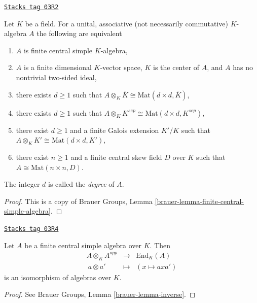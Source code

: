 \begin{theorem}
\label{etale-cohomology-theorem-central-simple-algebra}
\href{https://stacks.math.columbia.edu/tag/03R2}{\texttt{Stacks tag 03R2}}

Let $K$ be a field. For a unital, associative (not necessarily commutative)
$K$-algebra $A$ the following are equivalent
\begin{enumerate}
\item $A$ is finite central simple $K$-algebra,
\item $A$ is a finite dimensional $K$-vector space, $K$ is the center of $A$,
and $A$ has no nontrivial two-sided ideal,
\item there exists $d \geq 1$ such that
$A \otimes_K \bar K \cong \text{Mat}(d \times d, \bar K)$,
\item there exists $d \geq 1$ such that
$A \otimes_K K^{sep} \cong \text{Mat}(d \times d, K^{sep})$,
\item there exist $d \geq 1$ and a finite Galois extension $K'/K$
such that
$A \otimes_K K' \cong \text{Mat}(d \times d, K')$,
\item there exist $n \geq 1$ and a finite central skew field $D$
over $K$ such that $A \cong \text{Mat}(n \times n, D)$.
\end{enumerate}
The integer $d$ is called the {\it degree} of $A$.
\end{theorem}

\begin{proof}
This is a copy of
Brauer Groups, Lemma \ref{brauer-lemma-finite-central-simple-algebra}.
\end{proof}

\begin{lemma}
\label{etale-cohomology-lemma-brauer-inverse}
\href{https://stacks.math.columbia.edu/tag/03R4}{\texttt{Stacks tag 03R4}}

Let $A$ be a finite central simple algebra over $K$. Then
$$
\begin{matrix}
A \otimes_K A^{opp} & \longrightarrow & \text{End}_K(A) \\
\ a \otimes a' & \longmapsto & (x \mapsto a x a')
\end{matrix}
$$
is an isomorphism of algebras over $K$.
\end{lemma}

\begin{proof}
See
Brauer Groups, Lemma \ref{brauer-lemma-inverse}.
\end{proof}

